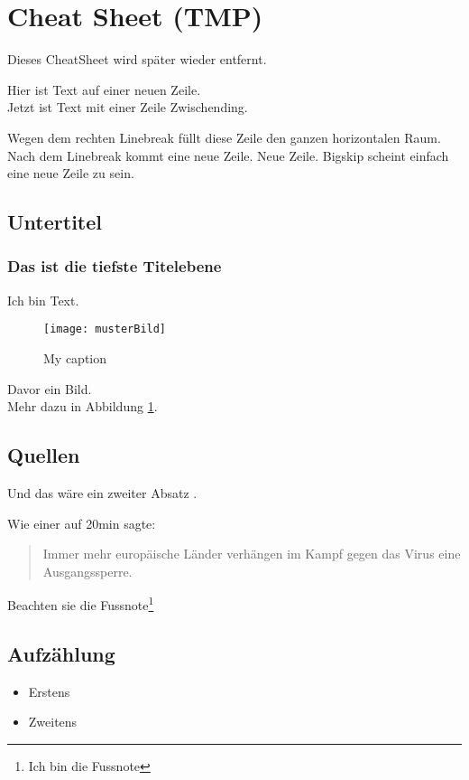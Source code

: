 \section{Cheat Sheet (TMP)}
Dieses CheatSheet wird später wieder entfernt.

Hier ist Text auf einer neuen Zeile. \\

Jetzt ist Text mit einer Zeile Zwischending.

Wegen dem rechten Linebreak füllt diese Zeile den ganzen horizontalen Raum. Nach dem Linebreak \linebreak  kommt eine neue Zeile.
Neue Zeile. \bigskip
Bigskip scheint einfach eine neue Zeile zu sein.

\subsection{Untertitel}
\subsubsection{Das ist die tiefste Titelebene}
Ich bin Text.
\begin{figure}[H]
    \centering
    \texttt{[image: musterBild]}
    \caption{My caption}
    \label{fig:bsp}
\end{figure}
Davor ein Bild. \\
Mehr dazu in Abbildung \ref{fig:bsp}.

\subsection{Quellen}
Und das wäre ein zweiter Absatz \cite{ba}.

Wie einer auf 20min sagte:\cite{dev}
\begin{quote}
Immer mehr europäische Länder verhängen im Kampf gegen das Virus eine Ausgangssperre.
\end{quote}

Beachten sie die Fussnote\footnote{Ich bin die Fussnote}

\subsection{Aufzählung}
\begin{itemize}
    \item Erstens
    \item Zweitens
\end{itemize}

